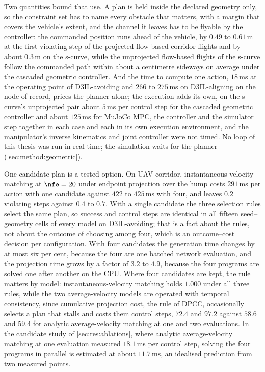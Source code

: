 Two quantities bound that use. A plan is held inside the declared geometry only, so the constraint set
has to name every obstacle that matters, with a margin that covers the vehicle's extent, and the
channel it leaves has to be flyable by the controller: the commanded position runs ahead of the
vehicle, by $0.49$ to $0.61$\,m at the first violating step of the projected flow-based corridor
flights and by about $0.3$\,m on the s-curve, while the unprojected flow-based flights of the s-curve
follow the commanded path within about a centimetre sideways on average under the cascaded geometric
controller. And the time to compute one action, $18$\,ms at
the operating point of D3IL-avoiding and $266$ to $275$\,ms on D3IL-aligning on the node of record,
prices the planner alone; the execution adds its own, on the s-curve's unprojected pair about
$5$\,ms per control step for the cascaded geometric controller and about $125$\,ms for MuJoCo MPC,
the controller and the simulator step together in each case and each in its own execution
environment, and the manipulator's inverse kinematics and joint controller were not timed. No loop of this thesis was run in real time;
the simulation waits for the planner (\autoref{sec:method:geometric}).

One candidate plan is a tested option. On UAV-corridor, instantaneous-velocity matching at $\nfe = 20$
under endpoint projection over the hump costs $291$\,ms per action with one candidate against $422$
to $425$\,ms with four, and leaves $0.2$ violating steps against $0.4$ to $0.7$. With a single
candidate the three selection rules select the same plan, so success and control steps are identical
in all fifteen seed--geometry cells of every model on D3IL-avoiding; that is a fact about the rules,
not about the outcome of choosing among four, which is an outcome--cost decision per configuration.
With four candidates the generation time changes by at most six per cent, because the four are one
batched network evaluation, and the projection time grows by a factor of $3.2$ to $4.9$, because the
four programs are solved one after another on the CPU. Where four candidates are kept, the rule
matters by model: instantaneous-velocity matching holds $1.000$ under all three rules, while the two
average-velocity models are operated with temporal consistency, since cumulative projection cost, the
rule of \ac{DPCC}, occasionally selects a plan that stalls and costs them control steps, $72.4$ and
$97.2$ against $58.6$ and $59.4$ for analytic average-velocity matching at one and two evaluations.
In the candidate study of \autoref{sec:res:ablations}, where analytic average-velocity matching at one
evaluation measured $18.1$\,ms per control step, solving the four programs in parallel is estimated
at about $11.7$\,ms, an idealised prediction from two measured points.

